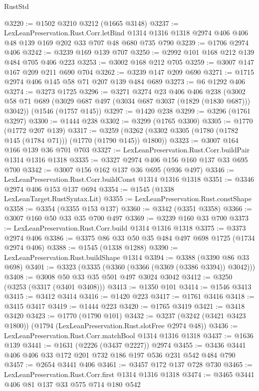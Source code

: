 \begin{lexlean}{RustStd}
\begin{coremodule}
@3220 := @1502 @3210 @3212 (@1665 @3148)
@3237 := LexLeanPreservation.Rust.Corr.letBind
    @1314
    @1316
    @1318
    @2974
    @406
    @406
    @48
    @139
    @169
    @202
    @33
    @707
    @48
    @680
    @735
    @790
@3239 := @1706 @2974 @406
@3242 := @3239 @169 @139 @707
@3250 := @2992 @101 @168 @212 @139 @484 @705 @406 @223
@3253 := @3002 @168 @212 @705
@3259 := @3007 @147 @167 @209 @211 @690 @704
@3262 := @3239 @147 @209 @690
@3271 := @1715 @2974 @406 @145 @58 @71 @207 @139 @484 @689
@3273 := @6 @1292 @406
@3274 := @3273 @1725
@3296 := @3271
    @3274
    @23
    @406
    @406
    @238
    (@3002 @58 @71 @689 (@3029 @687 @497 (@3034 @687 @3037 (@1829 (@1830 @687))) @3042))
    (@1546 (@1757 @145))
@3297 := @1420 @238
@3299 := @3296 (@1761 @3297)
@3300 := @1444 @238
@3302 := @3299 (@1765 @3300)
@3305 := @1770 (@1772 @207 @139)
@3317 := @3259 (@3262 (@3302 @3305 (@1780 (@1782 @145 (@1784 @71))) (@1770 (@1790 @145)) @1800))
@3323 := @3007 @164 @166 @139 @36 @701 @703
@3327 := LexLeanPreservation.Rust.Corr.buildPair @1314 @1316 @1318
@3335 := @3327 @2974 @406 @156 @160 @137 @33 @695 @700
@3342 := @3007 @156 @162 @137 @36 @695 (@936 @497)
@3346 := LexLeanPreservation.Rust.Corr.buildConst @1314 @1316 @1318
@3351 := @3346 @2974 @406 @153 @137 @694
@3354 := @1545 (@1338 LexLeanTarget.RustSyntax.Lit)
@3355 := LexLeanPreservation.Rust.constShape
@3358 := @3354 (@3355 @153 @137)
@3360 := @3342 (@3351 @3358)
@3366 := @3007 @160 @50 @33 @35 @700 @497
@3369 := @3239 @160 @33 @700
@3373 := LexLeanPreservation.Rust.Corr.build @1314 @1316 @1318
@3375 := @3373 @2974 @406
@3386 := @3375 @86 @33 @50 @35 @484 @497 @698 @1725 (@1734 @2974 @406)
@3388 := @1545 (@1338 @1288)
@3390 := LexLeanPreservation.Rust.buildShape @1314
@3394 := @3388 (@3390 @86 @33 @698)
@3401 := @3323 (@3335 (@3360 (@3366 (@3369 (@3386 @3394)) @3042)))
@3408 := @3008 @50 @33 @35 @501 @497 @3024 @3042
@3412 := @3250 (@3253 (@3317 (@3401 @3408)))
@3413 := @1350 @101
@3414 := @1546 @3413
@3415 := @3412 @3414
@3416 := @1420 @223
@3417 := @1761 @3416
@3418 := @3415 @3417
@3419 := @1444 @223
@3420 := @1765 @3419
@3421 := @3418 @3420
@3423 := @1770 (@1790 @101)
@3432 := @3237 (@3242 (@3421 @3423 @1800)) (@1794 (LexLeanPreservation.Rust.slotFree @2974 @48))
@3436 := LexLeanPreservation.Rust.Corr.matchBool @1314 @1316 @1318
@3437 := @1636 @139
@3441 := @1631 (@2226 (@3437 @2227)) @2974
@3455 := @3436 @3441 @406 @406 @33 @172 @201 @732 @186 @197 @536 @231 @542 @484 @790
@3457 := @2654 @3441 @406
@3461 := @3457 @172 @137 @728 @730
@3465 := LexLeanPreservation.Rust.Corr.first @1314 @1316 @1318
@3474 := @3465 @3441 @406 @81 @137 @33 @575 @714 @180 @542

\end{coremodule}
\end{lexlean}

